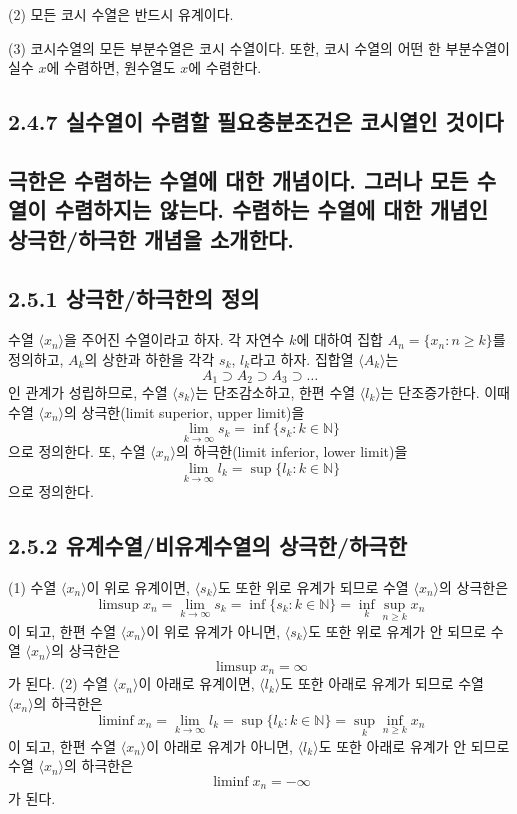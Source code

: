\documentclass{article}
\begin{document}
(2) 모든 코시 수열은 반드시 유계이다.  

(3) 코시수열의 모든 부분수열은 코시 수열이다. 또한, 코시 수열의 어떤 한 부분수열이 실수 \( x \)에 수렴하면, 원수열도 \( x \)에 수렴한다.


\subsection*{\textmd{2.4.7 실수열이 수렴할 필요충분조건은 코시열인 것이다}}

\subsection{\fontsize{11.5}{13}\selectfont 극한은 수렴하는 수열에 대한 개념이다. 그러나 모든 수열이 수렴하지는 않는다. 수렴하는 수열에 대한 개념인 상극한/하극한 개념을 소개한다.}

\subsection*{\textmd{2.5.1 상극한/하극한의 정의}}
수열 \( \langle x_n \rangle \)을 주어진 수열이라고 하자. 각 자연수 \( k \)에 대하여 집합 \( A_n = \{ x_n : n \geq k \} \)를 정의하고, \( A_k \)의 상한과 하한을 각각 \( s_k \), \( l_k \)라고 하자. 집합열 \( \langle A_k \rangle \)는 
\[
A_1 \supset A_2 \supset A_3 \supset \dots
\]
인 관계가 성립하므로, 수열 \( \langle s_k \rangle \)는 단조감소하고, 한편 수열 \( \langle l_k \rangle \)는 단조증가한다. 이때
수열 \( \langle x_n \rangle \)의 상극한(limit superior, upper limit)을 
\[
\lim_{k \to \infty} s_k = \inf \{ s_k : k \in \mathbb{N} \}
\]
으로 정의한다.
또, 수열 \( \langle x_n \rangle \)의 하극한(limit inferior, lower limit)을 
\[
\lim_{k \to \infty} l_k = \sup \{ l_k : k \in \mathbb{N} \}
\]
으로 정의한다.

\subsection*{\textmd{2.5.2 유계수열/비유계수열의 상극한/하극한}}
(1) 수열 \( \langle x_n \rangle \)이 위로 유계이면, \( \langle s_k \rangle \)도 또한 위로 유계가 되므로 수열 \( \langle x_n \rangle \)의 상극한은
\[
\limsup x_n = \lim_{k \to \infty} s_k = \inf \{ s_k : k \in \mathbb{N} \} = \inf_k \sup_{n \geq k} x_n
\]
이 되고, 한편 수열 \( \langle x_n \rangle \)이 위로 유계가 아니면, \( \langle s_k \rangle \)도 또한 위로 유계가 안 되므로 수열 \( \langle x_n \rangle \)의 상극한은
\[
\limsup x_n = \infty
\]
가 된다.
(2) 수열 \( \langle x_n \rangle \)이 아래로 유계이면, \( \langle l_k \rangle \)도 또한 아래로 유계가 되므로 수열 \( \langle x_n \rangle \)의 하극한은
\[
\liminf x_n = \lim_{k \to \infty} l_k = \sup \{ l_k : k \in \mathbb{N} \} = \sup_k \inf_{n \geq k} x_n
\]
이 되고, 한편 수열 \( \langle x_n \rangle \)이 아래로 유계가 아니면, \( \langle l_k \rangle \)도 또한 아래로 유계가 안 되므로 수열 \( \langle x_n \rangle \)의 하극한은
\[
\liminf x_n = -\infty
\]
가 된다.
\end{document}
